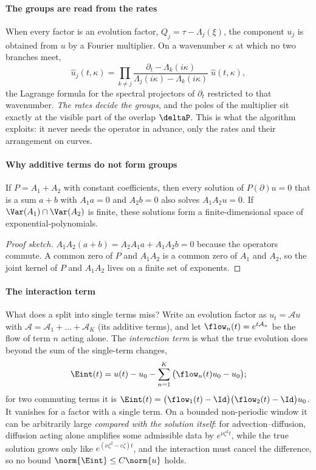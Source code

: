 \paragraph{The groups are read from the rates} When every factor is an evolution factor, $Q_j=\tau-\Lambda_j(\xi)$, the
component $u_j$ is obtained from $u$ by a Fourier multiplier. On a wavenumber $\kappa$ at which no two branches meet,
\begin{equation}\label{eq:lagrange}
  \hat u_j(t,\kappa)=\prod_{k\neq j}\frac{\partial_t-\Lambda_k(i\kappa)}{\Lambda_j(i\kappa)-\Lambda_k(i\kappa)}\;\hat u(t,\kappa),
\end{equation}
the Lagrange formula for the spectral projectors of $\partial_t$ restricted to that wavenumber. \emph{The rates decide
the groups}, and the poles of the multiplier sit exactly at the visible part of the overlap $\deltaP$. This is what the
algorithm exploits: it never needs the operator in advance, only the rates and their arrangement on curves.

\paragraph{Why additive terms do not form groups}
\begin{proposition}\label{prop:terms}
If $P=A_1+A_2$ with constant coefficients, then every solution of $P(\partial)u=0$ that is a sum $a+b$ with $A_1a=0$
and $A_2b=0$ also solves $A_1A_2u=0$. If $\Var(A_1)\cap\Var(A_2)$ is finite, these solutions form a finite-dimensional
space of exponential-polynomials.
\end{proposition}
\begin{proof}[Proof sketch]
$A_1A_2(a+b)=A_2A_1a+A_1A_2b=0$ because the operators commute. A common zero of $P$ and $A_1A_2$ is a common zero of $A_1$
and $A_2$, so the joint kernel of $P$ and $A_1A_2$ lives on a finite set of exponents.
\end{proof}

\paragraph{The interaction term} What does a split into single terms miss? Write an evolution factor as
$u_t=\mathcal Au$ with $\mathcal A=\mathcal A_1+\dots+\mathcal A_K$ (its additive terms), and let $\flow_n(t)=e^{t\mathcal A_n}$
be the flow of term $n$ acting alone. The \emph{interaction term} is what the true evolution does beyond the sum of the
single-term changes,
\begin{equation}\label{eq:eint}
  \Eint(t)=u(t)-u_0-\sum_{n=1}^K\big(\flow_n(t)u_0-u_0\big);
\end{equation}
for two commuting terms it is $\Eint(t)=\big(\flow_1(t)-\Id\big)\big(\flow_2(t)-\Id\big)u_0$. It vanishes for a factor with
a single term. On a bounded non-periodic window it can be arbitrarily large \emph{compared with the solution itself}: for
advection--diffusion, diffusion acting alone amplifies some admissible data by $e^{\nu\zeta^2t}$, while the true solution
grows only like $e^{(\nu\zeta^2-c\zeta)t}$, and the interaction must cancel the difference, so no bound
$\norm{\Eint}\le C\norm{u}$ holds.


